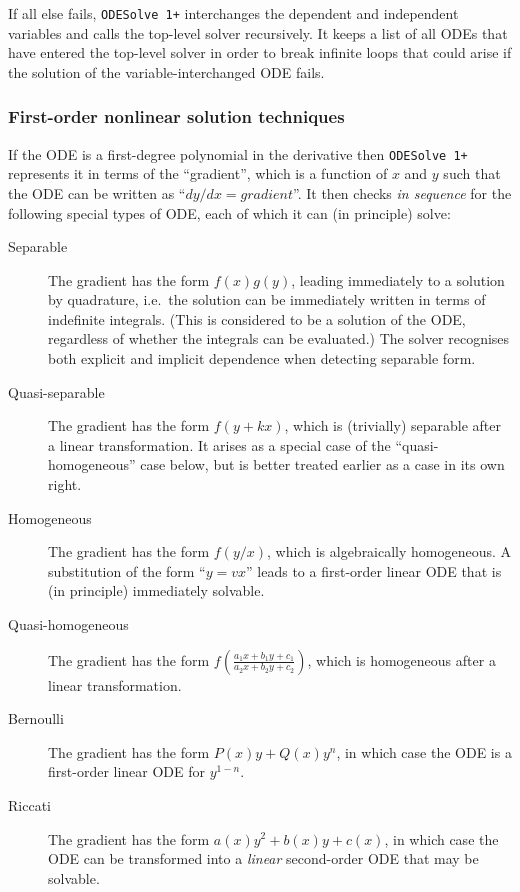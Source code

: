 \documentclass[a4paper]{article} %
\newcommand{\ODESolve}[1]{\texttt{ODESolve\,#1}}
\begin{document}
If all else fails, \ODESolve{1+} interchanges the dependent and
independent variables and calls the top-level solver recursively.  It
keeps a list of all ODEs that have entered the top-level solver in
order to break infinite loops that could arise if the solution of the
variable-interchanged ODE fails.


\subsubsection{First-order nonlinear solution techniques}

If the ODE is a first-degree polynomial in the derivative then
\ODESolve{1+} represents it in terms of the ``gradient'', which is a
function of $x$ and $y$ such that the ODE can be written as ``$dy/dx =
\textit{gradient}$''.  It then checks \emph{in sequence} for the
following special types of ODE, each of which it can (in principle)
solve:
\begin{description}
\item[Separable] The gradient has the form $f(x)g(y)$, leading
immediately to a solution by quadrature, i.e.\ the solution can be
immediately written in terms of indefinite integrals.  (This is
considered to be a solution of the ODE, regardless of whether the
integrals can be evaluated.)  The solver recognises both explicit and
implicit dependence when detecting separable form.

\item[Quasi-separable] The gradient has the form $f(y+kx)$, which is
(trivially) separable after a linear transformation.  It arises as a
special case of the ``quasi-homogeneous'' case below, but is better
treated earlier as a case in its own right.

\item[Homogeneous] The gradient has the form $f(y/x)$, which is
algebraically homogeneous.  A substitution of the form ``$y = vx$''
leads to a first-order linear ODE that is (in principle) immediately
solvable.

\item[Quasi-homogeneous] The gradient has the form $f(\frac{a_1x +
b_1y + c_1}{a_2x + b_2y + c_2})$, which is homogeneous after a linear
transformation.

\item[Bernoulli] The gradient has the form $P(x) y + Q(x) y^n$, in
which case the ODE is a first-order linear ODE for $y^{1-n}$.

\item[Riccati] The gradient has the form $a(x)y^2 + b(x)y + c(x)$, in
which case the ODE can be transformed into a \emph{linear}
second-order ODE that may be solvable.
\end{description}
\end{document}
